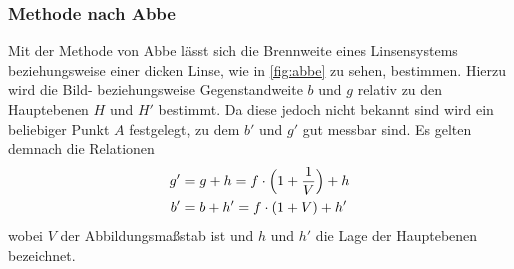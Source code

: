     \subsubsection{Methode nach Abbe}    
        Mit der Methode von Abbe lässt sich die Brennweite eines Linsensystems beziehungsweise einer dicken Linse,
        wie in \autoref{fig:abbe} zu sehen, bestimmen. Hierzu wird die Bild- beziehungsweise Gegenstandweite $b$ und $g$ relativ zu
        den Hauptebenen $H$ und $H'$ bestimmt. Da diese jedoch nicht bekannt sind wird ein beliebiger Punkt $A$ festgelegt, zu dem
        $b'$ und $g'$ gut messbar sind. Es gelten demnach die Relationen
        \begin{align}
        \label{eqn:abbe}
        g' &= g + h = f \cdot \Bigl(1 + \frac{1}{V}  \Bigr )+ h \\
        b' &= b + h' = f \cdot (1 + V) + h'
        \end{align}
        wobei $V$ der Abbildungsmaßstab ist und $h$ und $h'$ die Lage der Hauptebenen bezeichnet.
